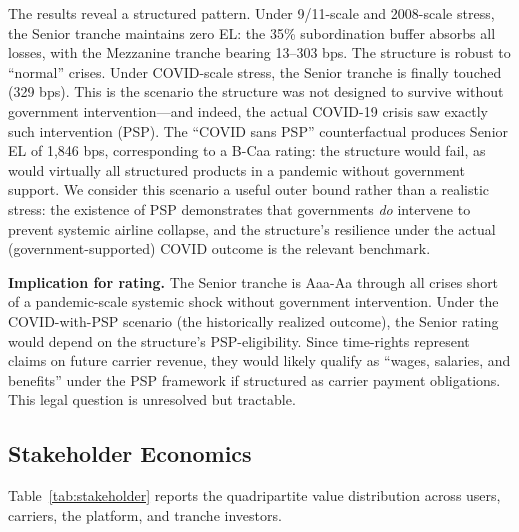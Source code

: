 \documentclass[12pt,a4paper]{article}
\begin{document}
The results reveal a structured pattern. Under 9/11-scale and 2008-scale stress, the Senior tranche maintains zero EL: the 35\% subordination buffer absorbs all losses, with the Mezzanine tranche bearing 13--303 bps. The structure is robust to ``normal'' crises. Under COVID-scale stress, the Senior tranche is finally touched (329 bps). This is the scenario the structure was not designed to survive without government intervention—and indeed, the actual COVID-19 crisis saw exactly such intervention (PSP). The ``COVID sans PSP'' counterfactual produces Senior EL of 1,846 bps, corresponding to a B-Caa rating: the structure would fail, as would virtually all structured products in a pandemic without government support. We consider this scenario a useful outer bound rather than a realistic stress: the existence of PSP demonstrates that governments \textit{do} intervene to prevent systemic airline collapse, and the structure's resilience under the actual (government-supported) COVID outcome is the relevant benchmark.

\textbf{Implication for rating.} The Senior tranche is Aaa-Aa through all crises short of a pandemic-scale systemic shock without government intervention. Under the COVID-with-PSP scenario (the historically realized outcome), the Senior rating would depend on the structure's PSP-eligibility. Since time-rights represent claims on future carrier revenue, they would likely qualify as ``wages, salaries, and benefits'' under the PSP framework if structured as carrier payment obligations. This legal question is unresolved but tractable.

\subsection{Stakeholder Economics}

Table~\ref{tab:stakeholder} reports the quadripartite value distribution across users, carriers, the platform, and tranche investors.
\end{document}
